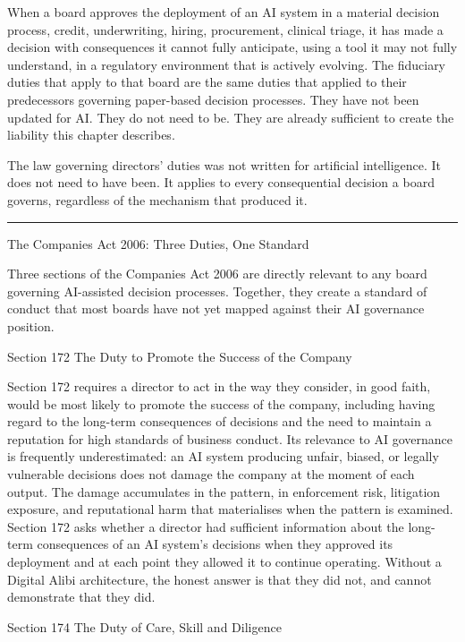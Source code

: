When a board approves the deployment of an AI system in a material decision process, credit, underwriting, hiring, procurement, clinical triage, it has made a decision with consequences it cannot fully anticipate, using a tool it may not fully understand, in a regulatory environment that is actively evolving. The fiduciary duties that apply to that board are the same duties that applied to their predecessors governing paper-based decision processes. They have not been updated for AI. They do not need to be. They are already sufficient to create the liability this chapter describes.

The law governing directors' duties was not written for artificial intelligence. It does not need to have been. It applies to every consequential decision a board governs, regardless of the mechanism that produced it.

\begin{center}\rule{0.5\linewidth}{0.5pt}\end{center}

The Companies Act 2006: Three Duties, One Standard

Three sections of the Companies Act 2006 are directly relevant to any board governing AI-assisted decision processes. Together, they create a standard of conduct that most boards have not yet mapped against their AI governance position.

Section 172 The Duty to Promote the Success of the Company

Section 172 requires a director to act in the way they consider, in good faith, would be most likely to promote the success of the company, including having regard to the long-term consequences of decisions and the need to maintain a reputation for high standards of business conduct. Its relevance to AI governance is frequently underestimated: an AI system producing unfair, biased, or legally vulnerable decisions does not damage the company at the moment of each output. The damage accumulates in the pattern, in enforcement risk, litigation exposure, and reputational harm that materialises when the pattern is examined. Section 172 asks whether a director had sufficient information about the long-term consequences of an AI system's decisions when they approved its deployment and at each point they allowed it to continue operating. Without a Digital Alibi architecture, the honest answer is that they did not, and cannot demonstrate that they did.

Section 174 The Duty of Care, Skill and Diligence

